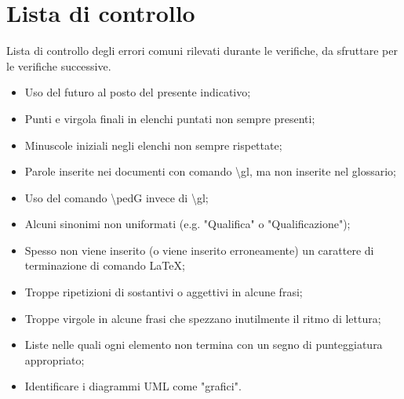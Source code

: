 \documentclass[../NormeDiProgetto.tex]{subfiles}
\begin{document}
	\section{Lista di controllo}
		Lista di controllo degli errori comuni rilevati durante le verifiche, da sfruttare per le verifiche
		successive.
		\begin{itemize}
			\item Uso del futuro al posto del presente indicativo;
			\item Punti e virgola finali in elenchi puntati non sempre presenti;
			\item Minuscole iniziali negli elenchi non sempre rispettate;
			\item Parole inserite nei documenti con comando \textbackslash gl, ma non inserite nel glossario;
			\item Uso del comando \textbackslash ped{G} invece di \textbackslash gl;
			\item Alcuni sinonimi non uniformati (e.g. "Qualifica" o "Qualificazione");
			\item Spesso non viene inserito (o viene inserito erroneamente) un carattere di terminazione di
			comando \LaTeX;
			\item Troppe ripetizioni di sostantivi o aggettivi in alcune frasi;
			\item Troppe virgole in alcune frasi che spezzano inutilmente il ritmo di lettura;
			\item Liste nelle quali ogni elemento non termina con un segno di punteggiatura appropriato;
			\item Identificare i diagrammi UML come "grafici".
		\end{itemize}
\end{document}
